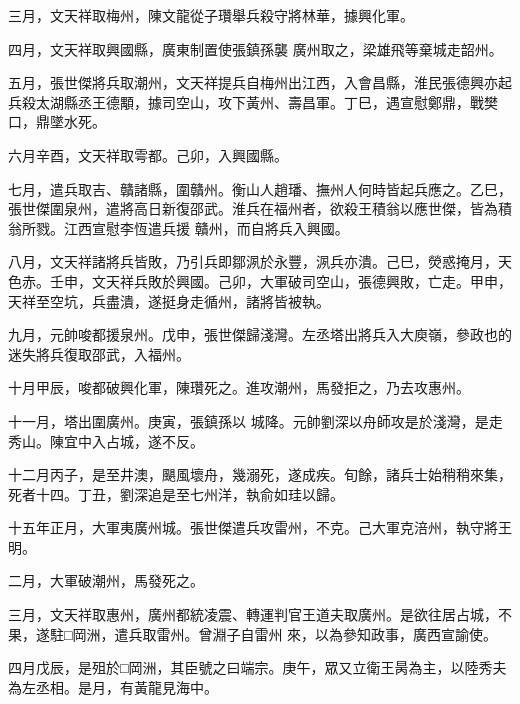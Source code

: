 \begin{pinyinscope}
 三月，文天祥取梅州，陳文龍從子瓚舉兵殺守將林華，據興化軍。



 四月，文天祥取興國縣，廣東制置使張鎮孫襲
 廣州取之，梁雄飛等棄城走韶州。



 五月，張世傑將兵取潮州，文天祥提兵自梅州出江西，入會昌縣，淮民張德興亦起兵殺太湖縣丞王德顒，據司空山，攻下黃州、壽昌軍。丁巳，遇宣慰鄭鼎，戰樊口，鼎墜水死。



 六月辛酉，文天祥取雩都。己卯，入興國縣。



 七月，遣兵取吉、贛諸縣，圍贛州。衡山人趙璠、撫州人何時皆起兵應之。乙巳，張世傑圍泉州，遣將高日新復邵武。淮兵在福州者，欲殺王積翁以應世傑，皆為積翁所戮。江西宣慰李恆遣兵援
 贛州，而自將兵入興國。



 八月，文天祥諸將兵皆敗，乃引兵即鄒洬於永豐，洬兵亦潰。己巳，熒惑掩月，天色赤。壬申，文天祥兵敗於興國。己卯，大軍破司空山，張德興敗，亡走。甲申，天祥至空坑，兵盡潰，遂挺身走循州，諸將皆被執。



 九月，元帥唆都援泉州。戊申，張世傑歸淺灣。左丞塔出將兵入大庾嶺，參政也的迷失將兵復取邵武，入福州。



 十月甲辰，唆都破興化軍，陳瓚死之。進攻潮州，馬發拒之，乃去攻惠州。



 十一月，塔出圍廣州。庚寅，張鎮孫以
 城降。元帥劉深以舟師攻是於淺灣，是走秀山。陳宜中入占城，遂不反。



 十二月丙子，是至井澳，颶風壞舟，幾溺死，遂成疾。旬餘，諸兵士始稍稍來集，死者十四。丁丑，劉深追是至七州洋，執俞如珪以歸。



 十五年正月，大軍夷廣州城。張世傑遣兵攻雷州，不克。己大軍克涪州，執守將王明。



 二月，大軍破潮州，馬發死之。



 三月，文天祥取惠州，廣州都統凌震、轉運判官王道夫取廣州。是欲往居占城，不果，遂駐□岡洲，遣兵取雷州。曾淵子自雷州
 來，以為參知政事，廣西宣諭使。



 四月戊辰，是殂於□岡洲，其臣號之曰端宗。庚午，眾又立衛王昺為主，以陸秀夫為左丞相。是月，有黃龍見海中。




\end{pinyinscope}
